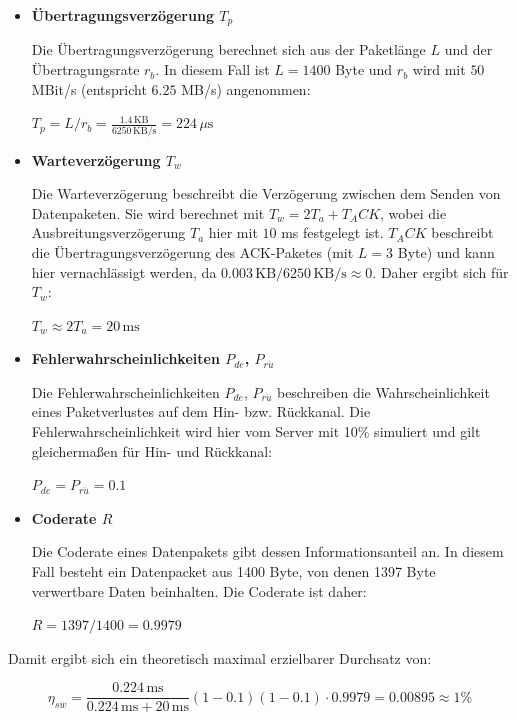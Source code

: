 \documentclass{article}
\begin{document}
			\begin{itemize}

				\item \textbf{Übertragungsverzögerung $T_p$}

				Die Übertragungsverzögerung berechnet sich aus der Paketlänge $L$ und der Übertragungsrate $r_b$. In diesem Fall ist $L = 1400$ Byte und $r_b$ wird mit $50$ MBit/s (entspricht $6.25$ MB/s) angenommen:

				$T_p = L/r_b = \frac{1.4\,\text{KB}}{6250\,\text{KB/s}} = 224\,\mu\text{s} $

				\item \textbf{Warteverzögerung $T_w$}

				Die Warteverzögerung beschreibt die Verzögerung zwischen dem Senden von Datenpaketen. Sie wird berechnet mit $T_w = 2T_a + T_ACK$, wobei die Ausbreitungsverzögerung $T_a$ hier mit $10$ ms festgelegt ist. $T_ACK$ beschreibt die Übertragungsverzögerung des ACK-Paketes (mit $L = 3$ Byte) und kann hier vernachlässigt werden, da $0.003\,\text{KB}/6250\,\text{KB/s} \approx 0$. Daher ergibt sich für $T_w$:

				$T_w \approx 2T_a = 20 \,\text{ms}$ 

				\item \textbf{Fehlerwahrscheinlichkeiten $P_{de}$, $P_{r\ddot{u}}$}

				Die Fehlerwahrscheinlichkeiten $P_{de}$, $P_{r\ddot{u}}$ beschreiben die Wahrscheinlichkeit eines Paketverlustes auf dem Hin- bzw. Rückkanal. Die Fehlerwahrscheinlichkeit wird hier vom Server mit 10\% simuliert und gilt gleichermaßen für Hin- und Rückkanal:

				$P_{de} = P_{r\ddot{u}} = 0.1$

				\item \textbf{Coderate $R$}

				Die Coderate eines Datenpakets gibt dessen Informationsanteil an. In diesem Fall besteht ein Datenpacket aus 1400 Byte, von denen 1397 Byte verwertbare Daten beinhalten. Die Coderate ist daher:

				$R = 1397/1400 = 0.9979$
			\end{itemize}

			Damit ergibt sich ein theoretisch maximal erzielbarer Durchsatz von:

			\begin{equation*}
				\eta_{sw} = \frac{0.224\,\text{ms}}{0.224\,\text{ms} + 20\,\text{ms}}(1-0.1)(1-0.1) \cdot 0.9979 = 0.00895 \approx 1 \%
			\end{equation*}
			\newline
\end{document}
